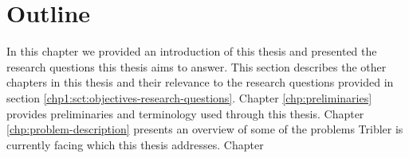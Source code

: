 \section{Outline}
In this chapter we provided an introduction of this thesis and presented the research questions this thesis aims to answer. 
This section describes the other chapters in this thesis and their relevance to the research questions provided in section \ref{chp1:sct:objectives-research-questions}.
Chapter \ref{chp:preliminaries} provides preliminaries and terminology used through this thesis.
Chapter \ref{chp:problem-description} presents an overview of some of the problems Tribler is currently facing which this thesis addresses.
Chapter 
